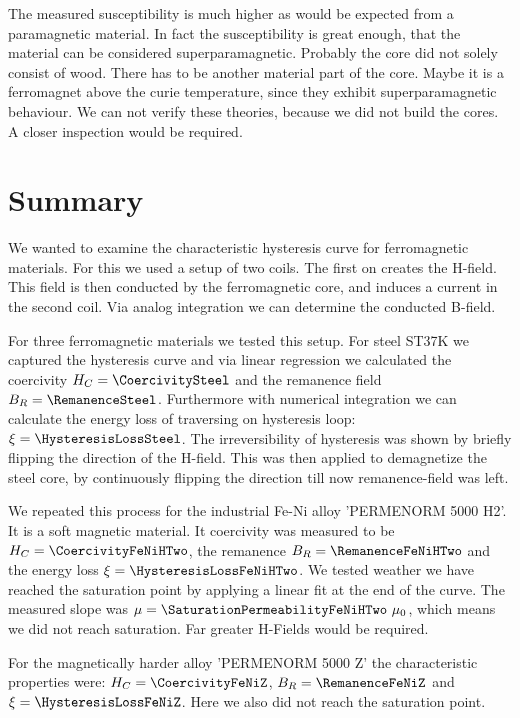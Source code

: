 \documentclass[a4paper,10pt,twocolumn]{article}
\begin{document}
    The measured susceptibility is much higher as would be expected from a paramagnetic material.
    In fact the susceptibility is great enough, that the material can be considered superparamagnetic.
    Probably the core did not solely consist of wood.
    There has to be another material part of the core.
    Maybe it is a ferromagnet above the curie temperature, since they exhibit superparamagnetic behaviour.
    We can not verify these theories, because we did not build the cores.
    A closer inspection would be required.
    
    \section{Summary}
    
    We wanted to examine the characteristic hysteresis curve for ferromagnetic materials.
    For this we used a setup of two coils.
    The first on creates the H-field.
    This field is then conducted by the ferromagnetic core, and induces a current in the second coil.
    Via analog integration we can determine the conducted B-field.
    
    For three ferromagnetic materials we tested this setup.
    For steel ST37K we captured the hysteresis curve and via linear regression we calculated the coercivity
    $H_C = \CoercivitySteel$ and the remanence field $B_R = \RemanenceSteel$.
    Furthermore with numerical integration we can calculate the energy loss of traversing on hysteresis loop:
    $\xi = \HysteresisLossSteel$.
    The irreversibility of hysteresis was shown by briefly flipping the direction of the H-field.
    This was then applied to demagnetize the steel core, by continuously flipping the direction till now remanence-field
    was left.
    
    We repeated this process for the industrial Fe-Ni alloy 'PERMENORM 5000 H2'.
    It is a soft magnetic material.
    It coercivity was measured to be $H_C = \CoercivityFeNiHTwo$, the remanence $B_R = \RemanenceFeNiHTwo$
    and the energy loss $\xi = \HysteresisLossFeNiHTwo$.
    We tested weather we have reached the saturation point by applying a linear fit at the end of the curve.
    The measured slope was $\mu = \SaturationPermeabilityFeNiHTwo \ \mu_0$, which means we did not reach saturation.
    Far greater H-Fields would be required.
    
    For the magnetically harder alloy 'PERMENORM 5000 Z' the characteristic properties were:
    $H_C = \CoercivityFeNiZ$, $B_R = \RemanenceFeNiZ$ and $\xi = \HysteresisLossFeNiZ$.
    Here we also did not reach the saturation point.
    
\end{document}
